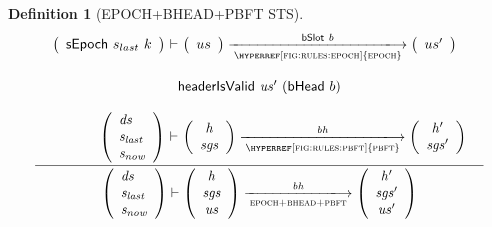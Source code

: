 \documentclass[11pt,a4paper]{article}
\newcommand{\var}[1]{\mathit{#1}}
\newcommand{\fun}[1]{\mathsf{#1}}
\newcommand{\trans}[2]{\xlongrightarrow[\textsc{#1}]{#2}}
\newtheorem{definition}{Definition}
\begin{document}
\begin{definition}[EPOCH+BHEAD+PBFT STS]\label{def:rule:epoch+bhead+pbft}
  $$
  \inference
  {
    {\begin{array}{r@{~\vdash~}l}
        {\left(
          \begin{array}{l}
            \sepoch{s_{last}}{k}\\
          \end{array}
        \right)}
        &
        {\left(
          \begin{array}{l}
            us
          \end{array}
        \right)}
        \trans{\hyperref[fig:rules:epoch]{epoch}}{\bslot{b}}
        {\left(
          \begin{array}{l}
            us'
          \end{array}
        \right)}\\
        \multicolumn{1}{l}{~}\\
        \multicolumn{2}{c}{\fun{headerIsValid}~\var{us'}~(\bhead{b})}\\
        \multicolumn{1}{l}{~}\\
        \left(
        {\begin{array}{l}
           \var{ds} \\
           \var{s_{last}} \\
           \var{s_{now}} \\
         \end{array}}
        \right)
        &
        \left(
          {\begin{array}{c}
             \var{h} \\
             \var{sgs}
           \end{array}}
        \right)
        \trans{\hyperref[fig:rules:pbft]{pbft}}{\var{bh}}
        \left(
        {\begin{array}{c}
           \var{h'} \\
           \var{sgs}'
         \end{array}}
        \right)\\
      \end{array}}
  }
  {
    {\left(
        {\begin{array}{l}
           \var{ds} \\
           \var{s_{last}} \\
           \var{s_{now}} \\
         \end{array}}
     \right)
     \vdash
     \left(
          {\begin{array}{c}
             \var{h} \\
             \var{sgs}\\
             \var{us}
           \end{array}}
       \right)
       \trans{epoch+bhead+pbft}{\var{bh}}
        \left(
        {\begin{array}{c}
           \var{h'} \\
           \var{sgs}'\\
           \var{us'}
         \end{array}}
     \right)
     }
   }
  $$
\end{definition}
\end{document}
